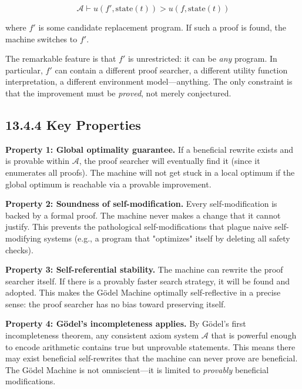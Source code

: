 \[
\mathcal{A} \vdash u(f', \text{state}(t)) > u(f, \text{state}(t))
\]

where $f'$ is some candidate replacement program. If such a proof is found, the machine switches to $f'$.

The remarkable feature is that $f'$ is unrestricted: it can be \textit{any} program. In particular, $f'$ can contain a different proof searcher, a different utility function interpretation, a different environment model---anything. The only constraint is that the improvement must be \textit{proved}, not merely conjectured.

\subsection{13.4.4 Key Properties}

\textbf{Property 1: Global optimality guarantee.} If a beneficial rewrite exists and is provable within $\mathcal{A}$, the proof searcher will eventually find it (since it enumerates all proofs). The machine will not get stuck in a local optimum if the global optimum is reachable via a provable improvement.

\textbf{Property 2: Soundness of self-modification.} Every self-modification is backed by a formal proof. The machine never makes a change that it cannot justify. This prevents the pathological self-modifications that plague naive self-modifying systems (e.g., a program that "optimizes" itself by deleting all safety checks).

\textbf{Property 3: Self-referential stability.} The machine can rewrite the proof searcher itself. If there is a provably faster search strategy, it will be found and adopted. This makes the Gödel Machine optimally self-reflective in a precise sense: the proof searcher has no bias toward preserving itself.

\textbf{Property 4: Gödel's incompleteness applies.} By Gödel's first incompleteness theorem, any consistent axiom system $\mathcal{A}$ that is powerful enough to encode arithmetic contains true but unprovable statements. This means there may exist beneficial self-rewrites that the machine can never prove are beneficial. The Gödel Machine is not omniscient---it is limited to \textit{provably} beneficial modifications.

